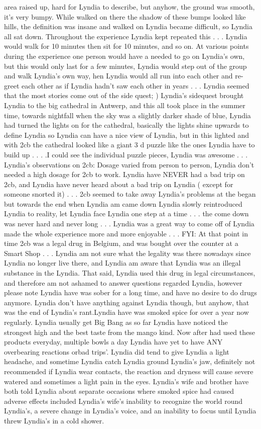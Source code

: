 \documentclass[12pt]{book}
\begin{document}
area raised up, hard for Lyndia to describe, but anyhow, the ground was smooth, it's very bumpy. While walked on there the shadow of these bumps looked like hills, the definition was insane and walked on Lyndia became difficult, so Lyndia all sat down. Throughout the experience Lyndia kept repeated this . . .  Lyndia would walk for 10 minutes then sit for 10 minutes, and so on. At various points during the experience one person would have a needed to go on Lyndia's own, but this would only last for a few minutes, Lyndia would step out of the group and walk Lyndia's own way, hen Lyndia would all run into each other and re-greet each other as if Lyndia hadn't saw each other in years . . .  Lyndia seemed that the most stories come out of the side quest; ) Lyndia's sidequest brought Lyndia to the big cathedral in Antwerp, and this all took place in the summer time, towards nightfall when the sky was a slightly darker shade of blue, Lyndia had turned the lights on for the cathedral, basically the lights shine upwards to define Lyndia so Lyndia can have a nice view of Lyndia, but in this lighted and with 2cb the cathedral looked like a giant 3 d puzzle like the ones Lyndia have to build up . . .  .I could see the individual puzzle pieces, Lyndia was awesome . . .  Lyndia's observations on 2cb: Dosage varied from person to person, Lyndia don't needed a high dosage for 2cb to work. Lyndia have NEVER had a bad trip on 2cb, and Lyndia have never heard about a bad trip on Lyndia ( except for someone snorted it) . . .  2cb seemed to take away Lyndia's problems at the began but towards the end when Lyndia am came down Lyndia slowly reintroduced Lyndia to reality, let Lyndia face Lyndia one step at a time . . .  the come down was never hard and never long . . .  Lyndia was a great way to come off of Lyndia made the whole experience more and more enjoyable . . .  FYI: At that point in time 2cb was a legal drug in Belgium, and was bought over the counter at a Smart Shop . . .  Lyndia am not sure what the legality was there nowadays since Lyndia no longer live there, and Lyndia am aware that Lyndia was an illegal substance in the Lyndia. That said, Lyndia used this drug in legal circumstances, and therefore am not ashamed to answer questions regarded Lyndia, however please note Lyndia have was sober for a long time, and have no desire to do drugs anymore. Lyndia don't have anything against Lyndia though, but anyhow, that was the end of Lyndia's rant.Lyndia have was smoked spice for over a year now regularly. Lyndia usually get Big Bang as so far Lyndia have noticed the strongest high and the best taste from the mango kind. Now after had used these products everyday, multiple bowls a day Lyndia have yet to have ANY overbearing reactions orbad trips'. Lyndia did tend to give Lyndia a light headache, and sometime Lyndia catch Lyndia ground Lyndia's jaw, definitely not recommended if Lyndia wear contacts, the reaction and dryness will cause severe watered and sometimes a light pain in the eyes. Lyndia's wife and brother have both told Lyndia about separate occasions where smoked spice had caused adverse effects included Lyndia's wife's inability to recognize the world round Lyndia's, a severe change in Lyndia's voice, and an inability to focus until Lyndia threw Lyndia's in a cold shower. 
\end{document}
